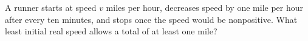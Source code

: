 A runner starts at speed $v$ miles per hour, decreases speed by one mile per hour after every ten minutes, and stops once the speed would be nonpositive. What least initial real speed allows a total of at least one mile?
